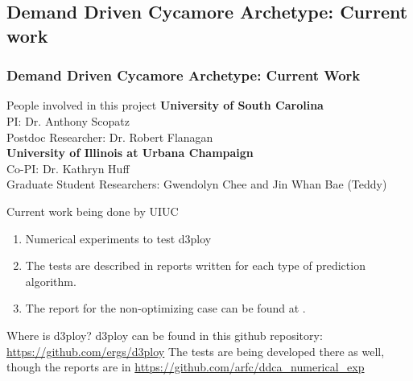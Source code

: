 \subsection{Demand Driven Cycamore Archetype:  Current work}
\begin{frame}
  \frametitle{Demand Driven Cycamore Archetype: Current Work}

\begin{block}{People involved in this project}
	\textbf{University of South Carolina}\\
	PI: Dr. Anthony Scopatz \\
	 Postdoc Researcher: Dr. Robert Flanagan \\
	\textbf{University of Illinois at Urbana Champaign} \\
	Co-PI: Dr. Kathryn Huff \\
	Graduate Student Researchers: Gwendolyn Chee and Jin Whan Bae (Teddy)
\end{block}

\begin{block}{Current work being done by UIUC}
	\begin{enumerate}
		\item Numerical experiments to test d3ploy
		\item The tests are described in reports written for each type of prediction algorithm. 
                \item The report for the non-optimizing case can be found at \cite{bae_numerical_2018}. 
	\end{enumerate}
\end{block}

\begin{block}{Where is d3ploy?}
	d3ploy can be found in this github repository: \url{https://github.com/ergs/d3ploy}
	The tests are being developed there as well, though the reports are in  
        \url{https://github.com/arfc/ddca_numerical_exp}
\end{block}

\end{frame}
